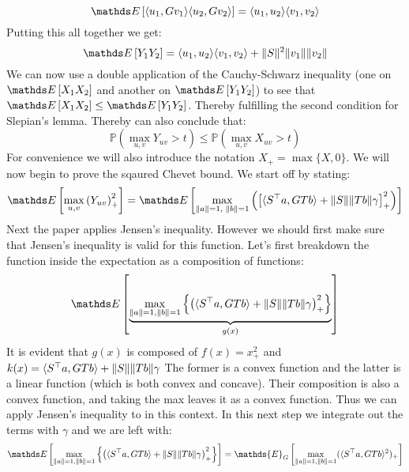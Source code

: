 \begin{equation*}
    \pexp{\dotprod{u_1, Gv_1}\dotprod{u_2, Gv_2}} = \dotprod{u_1, u_2}\dotprod{v_1, v_2}
\end{equation*}
Putting this all together we get:
\begin{equation*}
    \pexp{Y_1Y_2} = \dotprod{u_1, u_2}\dotprod{v_1, v_2} + \norm{S}^2\norm{v_1}\norm{v_2}
\end{equation*}
We can now use a double application of the Cauchy-Schwarz inequality (one on $\pexp{X_1X_2}$ and another on
$\pexp{Y_1Y_2}$) to see that $\pexp{X_1X_2} \leq \pexp{Y_1Y_2}$. Thereby fulfilling the second condition for Slepian’s
lemma. Thereby can also conclude that:
\begin{equation*}
    \mathbb{P}\left(\underset{u, v}{\max} Y_{uv} > t\right) \leq \mathbb{P}\left(\underset{u, v}{\max} X_{uv} > t\right)
\end{equation*}
For convenience we will also introduce the notation $X_{+}= \max\{X, 0\}$. We will now begin to prove the sqaured Chevet
bound. We start off by stating:
\begin{align*}
    \pexp{\underset{u, v}{\max} \left( Y_{uv}\right)_{+}^2 } = \pexp{\underset{\norm{a}=1,\;\norm{b}=1}{\max}\left(\left[\dotprod{S^{\top}a, GTb} + \norm{S}\norm{Tb}\gamma\right]_{+}^{2}\right)}
\end{align*}
Next the paper applies Jensen's inequality. However we should first make sure that Jensen's inequality is valid for this
function. Let's first breakdown the function inside the expectation as a composition of functions:
\begin{align*}
    \pexp{\underbrace{\underset{\norm{a}=1, \norm{b}=1}{\max}\left\{ \left( \dotprod{S^{\top}a, GTb} + \norm{S}\norm{Tb}\gamma \right)_{+}^{2} \right\}}_{g(x)}}
\end{align*}
It is evident that $g(x)$ is composed of $f(x) = x_{+}^{2}$ and $k(x) = \langle S^{\top}a, GTb \rangle + \lVert S \rVert\lVert Tb \rVert\gamma$ The former is a convex function and the latter is a linear function (which is both convex and
concave). Their composition is also a convex function, and taking the max leaves it as a convex function. Thus we can
apply Jensen's inequality to in this context. In this next step we integrate out the terms with $\gamma$ and we are left
with:
\begin{align*}
    \pexp{\underset{\norm{a}=1, \norm{b}=1}{\max}\left\{ \left( \dotprod{S^{\top}a, GTb} + \norm{S}\norm{Tb}\gamma \right)_{+}^{2} \right\}} = \mathds{E}_{G}\left[ \underset{\norm{a}=1, \norm{b}=1}{\max}(\dotprod{S^{\top}a, GTb}^2)_{+} \right]
\end{align*}

